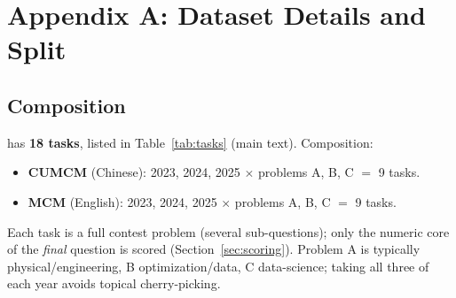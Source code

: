 \section{Appendix A: Dataset Details and Split}
\label{app:dataset}

\subsection{Composition}
\bench{} has \textbf{18 tasks}, listed in Table~\ref{tab:tasks} (main text). Composition:
\begin{itemize}[leftmargin=1.4em,itemsep=1pt]
\item \textbf{CUMCM} (Chinese): 2023, 2024, 2025 $\times$ problems A, B, C $=$ 9 tasks.
\item \textbf{MCM} (English): 2023, 2024, 2025 $\times$ problems A, B, C $=$ 9 tasks.
\end{itemize}
Each task is a full contest problem (several sub-questions); only the numeric core of the \emph{final} question is scored (Section~\ref{sec:scoring}). Problem A is typically physical/engineering, B optimization/data, C data-science; taking all three of each year avoids topical cherry-picking.

